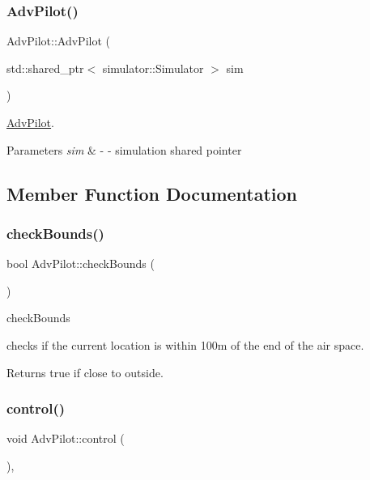 \subsubsection{\texorpdfstring{Adv\+Pilot()}{AdvPilot()}}
{\footnotesize\ttfamily Adv\+Pilot\+::\+Adv\+Pilot (\begin{DoxyParamCaption}\item[{std\+::shared\+\_\+ptr$<$ simulator\+::\+Simulator $>$}]{sim }\end{DoxyParamCaption})}



\hyperlink{classAdvPilot}{Adv\+Pilot}. 


\begin{DoxyParams}{Parameters}
{\em sim} & -\/ -\/ simulation shared pointer \\
\hline
\end{DoxyParams}


\subsection{Member Function Documentation}
\mbox{\label{classAdvPilot_ab765761fe28864de73c621b24b8f67cd}} 
\subsubsection{\texorpdfstring{check\+Bounds()}{checkBounds()}}
{\footnotesize\ttfamily bool Adv\+Pilot\+::check\+Bounds (\begin{DoxyParamCaption}{ }\end{DoxyParamCaption})\hspace{0.3cm}{\ttfamily [protected]}}



check\+Bounds 

checks if the current location is within 100m of the end of the air space. \begin{DoxyReturn}{Returns}
true if close to outside. 
\end{DoxyReturn}
\mbox{\label{classAdvPilot_a5da70d6e9d93bf585a84af786d067739}} 
\subsubsection{\texorpdfstring{control()}{control()}}
{\footnotesize\ttfamily void Adv\+Pilot\+::control (\begin{DoxyParamCaption}{ }\end{DoxyParamCaption})\hspace{0.3cm}{\ttfamily [protected]}, {\ttfamily [virtual]}}



